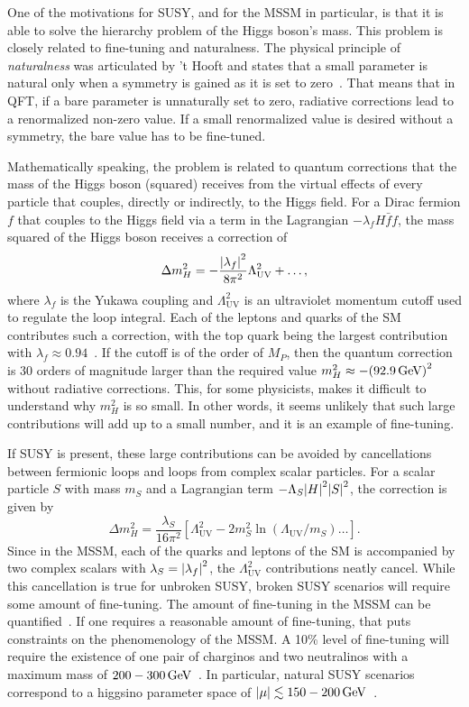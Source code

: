 One of the motivations for SUSY, and for the MSSM in particular, is that it is able to solve the hierarchy problem of the Higgs boson's mass. This problem is closely related to fine-tuning and naturalness. The physical principle of \emph{naturalness} was articulated by ’t Hooft and states that a small parameter is natural only when a symmetry is gained as it is set to zero~\cite{tHooft:1980xss,Seiberg_1993}. That means that in QFT, if a bare parameter is unnaturally set to zero, radiative corrections lead to a renormalized non-zero value. If a small renormalized value is desired without a symmetry, the bare value has to be fine-tuned.

Mathematically speaking, the problem is related to quantum corrections that the mass of the Higgs boson (squared) receives from the virtual effects of every particle that couples, directly or indirectly, to the Higgs field. For a Dirac fermion $f$ that couples to the Higgs field via a term in the Lagrangian $-\lambda_f H \bar{f}f$, the mass squared of the Higgs boson receives a correction of
\begin{equation}
\Delta m^2_H = -\frac{\abs{\lambda_f}^2}{8\pi^2}\Lambda^2_{\mathrm{UV}}+\ldots,
\end{equation} 
where $\lambda_f$ is the Yukawa coupling and $\Lambda^2_{\mathrm{UV}}$ is an ultraviolet momentum cutoff used to regulate the loop integral. Each of the leptons and quarks of the SM contributes such a correction, with the top quark being the largest contribution with $\lambda_f\approx 0.94$~\cite{MARTIN_1998}. If the cutoff is of the order of $M_P$, then the quantum correction is 30 orders of magnitude larger than the required value $m^2_H\approx-\qty(92.9\,\text{Ge\hspace{-.08em}V})^2$ without radiative corrections. This, for some physicists, makes it difficult to understand why $m^2_H$ is so small. In other words, it seems unlikely that such large contributions will add up to a small number, and it is an example of fine-tuning.

If SUSY is present, these large contributions can be avoided by cancellations between fermionic loops and loops from complex scalar particles. For a scalar particle $S$ with mass $m_S$ and a Lagrangian term $-\Lambda_S\abs{H}^2\abs{S}^2$, the correction is given by
\begin{equation}
\Delta m^2_H = \frac{\lambda_S}{16\pi^2}\left[\Lambda^2_{\mathrm{UV}} -2m_S^2\ln(\Lambda_{\mathrm{UV}}/m_S) \ldots\right].
\end{equation}
Since in the MSSM, each of the quarks and leptons of the SM is accompanied by two complex scalars with $\lambda_S=\abs{\lambda_f}^2$, the $\Lambda^2_{\mathrm{UV}}$ contributions neatly cancel. While this cancellation is true for unbroken SUSY, broken SUSY scenarios will require some amount of fine-tuning. The amount of fine-tuning in the MSSM can be quantified~\cite{Feng_2013,PhysRevD.58.096004}. If one requires a reasonable amount of fine-tuning, that puts constraints on the phenomenology of the MSSM. A 10\% level of fine-tuning will require the existence of one pair of charginos and two neutralinos with a maximum mass of $200-300\,\text{Ge\hspace{-.08em}V}$~\cite{natural-SUSY,BARBIERI198863,Antusch_2013,Papucci_2012}. In particular, natural SUSY scenarios correspond to a higgsino parameter space of $\abs{\mu}\lesssim 150-200\,\text{Ge\hspace{-.08em}V}$~\cite{Baer_2012}.
